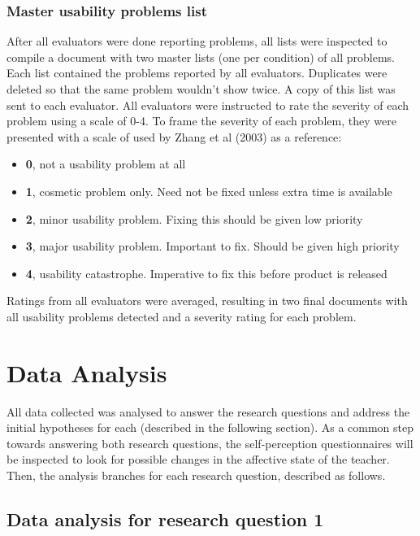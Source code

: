 \subsubsection{Master usability problems list}
After all evaluators were done reporting problems, all lists were inspected to compile a document with two master lists (one per condition) of all problems. Each list contained the problems reported by all evaluators. Duplicates were deleted so that the same problem wouldn't show twice. A copy of this list was sent to each evaluator.
All evaluators were instructed to rate the severity of each problem using a scale of 0-4. To frame the severity of each problem, they were presented with a scale of used by Zhang et al (2003) \cite{zhang_johnson_patel_paige_kubose_2003} as a reference:
\begin{itemize}
    \item \textbf{0}, not a usability problem at all
    \item \textbf{1}, cosmetic problem only. Need not be fixed unless extra time is available
    \item \textbf{2}, minor usability problem. Fixing this should be given low priority
    \item \textbf{3}, major usability problem. Important to fix. Should be given high priority
    \item \textbf{4}, usability catastrophe. Imperative to fix this before product is released
\end{itemize}
Ratings from all evaluators were averaged, resulting in two final documents with all usability problems detected and a severity rating for each problem.
\section{Data Analysis}
All data collected was analysed to answer the research questions and address the initial hypotheses for each (described in the following section). As a common step towards answering both research questions, the self-perception questionnaires will be inspected to look for possible changes in the affective state of the teacher. Then, the analysis branches for each research question, described as follows.
\subsection{Data analysis for research question 1}
